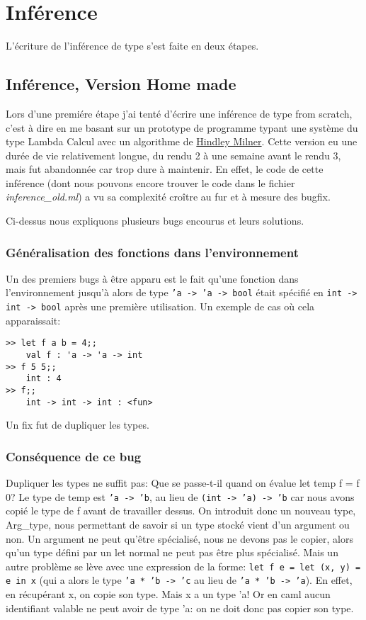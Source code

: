 \documentclass[paper=a4, fontsize=11pt, twocolumn]{article}
\begin{document}
\section{Inférence}
L'écriture de l'inférence de type s'est faite en deux étapes.
\subsection{Inférence, Version Home made}
Lors d'une premiére étape j'ai tenté d'écrire une inférence de type from scratch, c'est à dire en me basant sur un prototype de programme typant une système du type Lambda Calcul avec un algorithme de \href{https://en.wikipedia.org/wiki/Hindley\%E2\%80\%93Milner_type_system}{Hindley Milner}. Cette version eu une durée de vie relativement longue, du rendu 2 à une semaine avant le rendu 3, mais fut abandonnée car trop dure à maintenir. En effet, le code de cette inférence (dont nous pouvons encore trouver le code dans le fichier \textit{inference\_old.ml})  a vu sa complexité croître au fur et à mesure des bugfix.

Ci-dessus nous expliquons plusieurs bugs encourus et leurs solutions.
\subsubsection{Généralisation des fonctions dans l'environnement}
Un des premiers bugs à être apparu est le fait qu'une fonction dans l'environnement jusqu'à alors de type \texttt{'a -> 'a -> bool} était spécifié en \texttt{int -> int -> bool} après une première utilisation.
Un exemple de cas où cela apparaissait:
\begin{verbatim}
>> let f a b = 4;;
	val f : 'a -> 'a -> int
>> f 5 5;;
	int : 4
>> f;;
	int -> int -> int : <fun>
\end{verbatim}
Un fix fut de dupliquer les types.
\subsubsection{Conséquence de ce bug}
Dupliquer les types ne suffit pas: Que se passe-t-il quand on évalue let temp f = f 0? Le type de temp est \texttt{'a -> 'b}, au lieu de \texttt{(int -> 'a) -> 'b} car nous avons copié le type de f avant de travailler dessus. On introduit donc un nouveau type, Arg\_type, nous permettant de savoir si un type stocké vient d'un argument ou non. Un argument ne peut qu'être spécialisé, nous ne devons pas le copier, alors qu'un type défini par un let normal ne peut pas être plus spécialisé. 
Mais un autre problème se lève avec une expression de la forme: \texttt{let f e = let (x, y) = e in x} (qui a alors le type \texttt{'a * 'b -> 'c} au lieu de \texttt{'a * 'b -> 'a}). En effet, en récupérant x, on copie son type. Mais x a un type 'a! Or en caml aucun identifiant valable ne peut avoir de type 'a: on ne doit donc pas copier son type.
\end{document}
